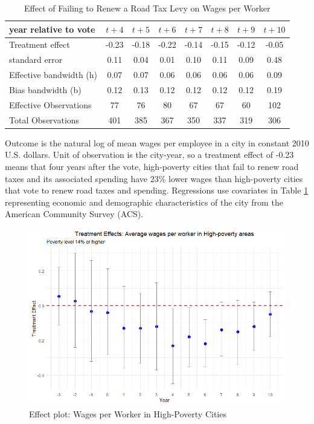 \begin{table}[ht]
    \centering
    \caption{Effect of Failing to Renew a Road Tax Levy on Wages per Worker}
    \label{tab:wages_per_worker}
    \begin{tabular}{p{2.8cm}ccccccc}
        \hline
        year relative to vote & $t + 4$ & $t + 5$ & $t + 6$ & $t + 7$ & $t + 8$ & $t + 9$ & $t + 10$ \\
        \hline
        Treatment effect & -0.23 & -0.18 & -0.22 & -0.14 & -0.15 & -0.12 & -0.05 \\
        standard error & 0.11 & 0.04 & 0.01 & 0.10 & 0.11 & 0.09 & 0.48 \\
        Effective bandwidth (h) & 0.07 & 0.07 & 0.06 & 0.06 & 0.06 & 0.06 & 0.09 \\
        Bias bandwidth (b) & 0.12 & 0.13 & 0.12 & 0.12 & 0.12 & 0.12 & 0.19 \\
        Effective Observations & 77 & 76 & 80 & 67 & 67 & 60 & 102 \\
        Total Observations & 401 & 385 & 367 & 350 & 337 & 319 & 306 \\
        \hline
    \end{tabular}
    \begin{tablenotes}
        \small 
        \item Outcome is the natural log of mean wages per employee in a city in constant 2010 U.S. dollars. Unit of observation is the city-year, so a treatment effect of -0.23 means that four years after the vote, high-poverty cities that fail to renew road taxes and its associated spending have 23\% lower wages than high-poverty cities that vote to renew road taxes and spending. Regressions use covariates in Table \ref{tab:wages_per_worker} representing economic and demographic characteristics of the city from the American Community Survey (ACS).
    \end{tablenotes}
\end{table}

\begin{figure}[htbp]
    \centering
    \includegraphics[width=\textwidth,keepaspectratio]{images/tes_high_pov.png}    
    \caption{Effect plot: Wages per Worker in High-Poverty Cities}
    \label{fig:tes_g_emp_hp}
\end{figure}

